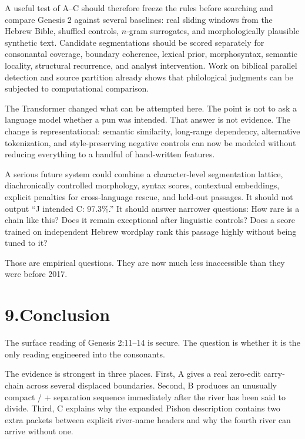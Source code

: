 A useful test of A--C should therefore freeze the rules before searching and compare Genesis 2 against several baselines: real sliding windows from the Hebrew Bible, shuffled controls, $n$-gram surrogates, and morphologically plausible synthetic text. Candidate segmentations should be scored separately for consonantal coverage, boundary coherence, lexical prior, morphosyntax, semantic locality, structural recurrence, and analyst intervention. Work on biblical parallel detection and source partition already shows that philological judgments can be subjected to computational comparison.\cite{NaaijerRoorda2016,YoffeEtAl2023}

The Transformer changed what can be attempted here.\cite{VaswaniEtAl2017} The point is not to ask a language model whether a pun was intended. That answer is not evidence. The change is representational: semantic similarity, long-range dependency, alternative tokenization, and style-preserving negative controls can now be modeled without reducing everything to a handful of hand-written features.

A serious future system could combine a character-level segmentation lattice, diachronically controlled morphology, syntax scores, contextual embeddings, explicit penalties for cross-language rescue, and held-out passages. It should not output ``J intended C: 97.3\%.'' It should answer narrower questions: How rare is a chain like this? Does it remain exceptional after linguistic controls? Does a score trained on independent Hebrew wordplay rank this passage highly without being tuned to it?

Those are empirical questions. They are now much less inaccessible than they were before 2017.

\section*{9.\quad Conclusion}

The surface reading of Genesis 2:11--14 is secure. The question is whether it is the only reading engineered into the consonants.

The evidence is strongest in three places. First, A gives a real zero-edit carry-chain across several displaced boundaries. Second, B produces an unusually compact / + separation sequence immediately after the river has been said to divide. Third, C explains why the expanded Pishon description contains two extra  packets between explicit river-name headers and why the fourth river can arrive without one.

